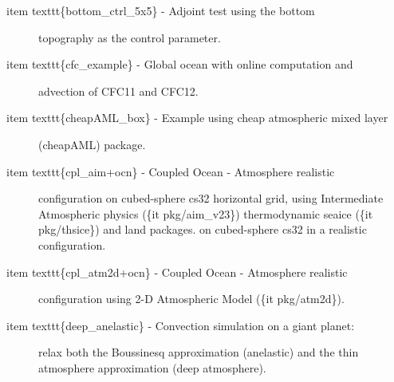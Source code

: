 \documentclass[letterpaper,10pt,english]{sphinxmanual}
\begin{document}
\begin{description}
\item[{item texttt\{bottom\_ctrl\_5x5\} - Adjoint test using the bottom}] \leavevmode
topography as the control parameter.

\item[{item texttt\{cfc\_example\} - Global ocean with online computation and}] \leavevmode
advection of CFC11 and CFC12.

\item[{item texttt\{cheapAML\_box\} - Example using cheap atmospheric mixed layer}] \leavevmode
(cheapAML) package.

\item[{item texttt\{cpl\_aim+ocn\} - Coupled Ocean - Atmosphere realistic}] \leavevmode
configuration on cubed-sphere cs32 horizontal grid,
using Intermediate Atmospheric physics (\{it pkg/aim\_v23\})
thermodynamic seaice (\{it pkg/thsice\}) and land packages.
on cubed-sphere cs32 in a realistic configuration.

\item[{item texttt\{cpl\_atm2d+ocn\} - Coupled Ocean - Atmosphere realistic}] \leavevmode
configuration using 2-D Atmospheric Model (\{it pkg/atm2d\}).

\item[{item texttt\{deep\_anelastic\} - Convection simulation on a giant planet:}] \leavevmode
relax both the Boussinesq approximation (anelastic) and the thin atmosphere
approximation (deep atmosphere).

\end{description}
\end{document}
